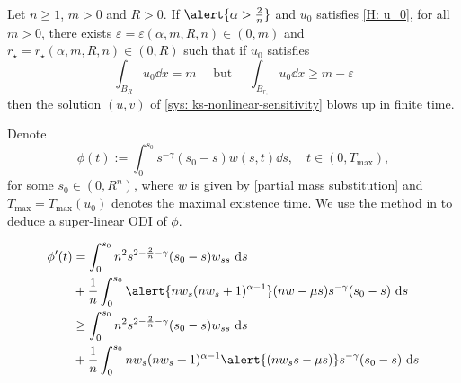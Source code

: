 \begin{frame}
\begin{lemma}\label{local blowup criterion}
Let $n\geqslant1$, $m>0$ and $R>0$. If $\alert{\alpha > \frac{2}{n}}$ and $u_0$ satisfies \eqref{H: u_0}, for all $m>0$, there exists $\varepsilon = \varepsilon(\alpha, m, R, n) \in (0, m)$ and $r_\star = r_\star(\alpha, m, R, n)\in (0 , R)$ such that if $u_0$ satisfies
	\begin{equation}\label{eq:u0 aggregates sufficiently}
		\int_{B_{R}} u_{0} \dd{x}=m \quad \text { but } \quad \int_{B_{r_{\star}}} u_{0} \dd {x} \geqslant m-\varepsilon
	\end{equation}
then the solution $(u, v)$ of \eqref{sys: ks-nonlinear-sensitivity} blows up in finite time.
\end{lemma}
Denote
\begin{equation}
\nonumber
\phi(t):= \int_0^{s_0}s^{-\gamma}(s_0-s)w(s,t)\dd s,\quad t\in(0,T_{\max}),
\end{equation}
for some $s_0\in(0,R^n)$, where $w$ is given by \eqref{partial mass substitution} and $T_{\max}=T_{\max}(u_0)$ denotes the maximal existence time.
We use the method in  to deduce a super-linear ODI of $\phi$.
\end{frame}

\begin{frame}
\begin{align*}
\nonumber
\phi'(t) &= \int_0^{s_0} n^2s^{2-\frac2n-\gamma}(s_0-s)w_{ss}\dd s \\ &+ \frac1n\int_0^{s_0}\alert{nw_s(nw_s+1)^{\alpha-1}}(nw-\mu s)s^{-\gamma}(s_0-s)\dd s\\
&\geq \int_0^{s_0} n^2s^{2-\frac2n-\gamma}(s_0-s)w_{ss}\dd s \\ &+ \frac1n\int_0^{s_0}nw_s(nw_s+1)^{\alpha-1}\alert{(nw_ss-\mu s)}s^{-\gamma}(s_0-s)\dd s
\end{align*}
\end{frame}

